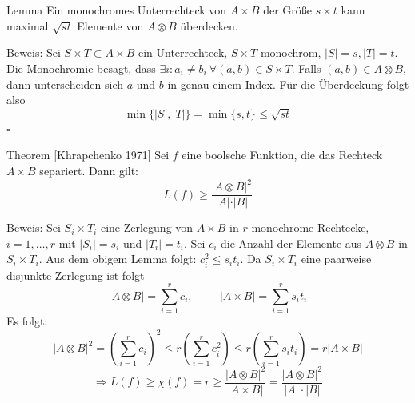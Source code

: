 \begin{frame}
    \begin{block}{Lemma}
        Ein monochromes Unterrechteck von $A \times B$ der Größe $s \times t$ kann maximal $\sqrt{st}$ Elemente von $A \otimes B$ überdecken.
    \end{block}
\end{frame}

\begin{frame}[t]
    Beweis:
    \newline
    \newline
    Sei $S\times T \subset A\times B$ ein Unterrechteck, $S\times T$ monochrom, $|S| = s, |T| = t$.
    \newline
    \newline
    Die Monochromie besagt, dass $\exists i: a_i \neq b_i\ \forall (a,b)\in S\times T$.
    \newline
    \newline
    Falls $(a,b) \in A\otimes B$, dann unterscheiden sich $a$ und $b$ in genau einem Index.
    \newline
    \newline
    Für die Überdeckung folgt also
    \[
        \min \{ |S|, |T|\} = \min \{ s, t\} \leq \sqrt{st}
    \]
    \hfill$\square$
\end{frame}

\begin{frame}
    \begin{block}{Theorem [Khrapchenko 1971]}
        Sei $f$ eine boolsche Funktion, die das Rechteck $A \times B$ separiert. Dann gilt:
        \[
            L(f) \geq \frac{\vert A \otimes B\vert ^2}{\vert A \vert\cdot\vert B\vert}
        \]
    \end{block}
\end{frame}

\begin{frame}[t]
    Beweis:
    \newline
    Sei $S_i\times T_i$ eine Zerlegung von $A\times B$ in $r$ monochrome Rechtecke, $i=1,\ldots,r$ mit $|S_i| = s_i$ und $|T_i| = t_i$.
    \newline
    Sei $c_i$ die Anzahl der Elemente aus $A\otimes B$ in $S_i\times T_i$.
    \newline
    \pause
    Aus dem obigem Lemma folgt: $c_i^2 \leq s_it_i$.
    \newline
    Da $S_i\times T_i$ eine paarweise disjunkte Zerlegung ist folgt
    \[
        |A\otimes B| = \sum\limits_{i=1}^r c_i, \hspace{1cm} |A\times B| = \sum\limits_{i=1}^r s_it_i
    \]
    \pause
    Es folgt:
    \[
        |A\otimes B|^2 = (\sum\limits_{i=1}^r c_i)^2 \leq
        r(\sum\limits_{i=1}^r c_i^2) \leq r(\sum\limits_{i=1}^r s_it_i) = r|A\times B|
    \]
    \pause
    \[
        \Rightarrow L(f) \geq \chi(f) = r \geq \frac{|A\otimes B|^2}{|A\times B|} = \frac{|A\otimes B|^2}{|A|\cdot|B|}
    \]
\end{frame}

